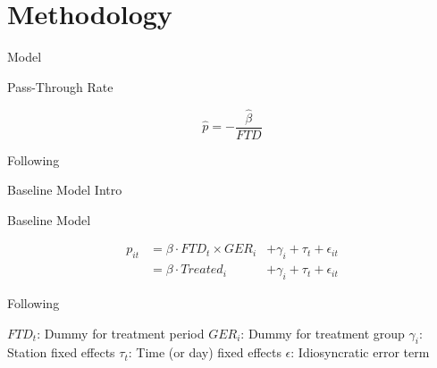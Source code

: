 \section{Methodology}






\begin{frame}{Model}


\vspace{-0.7cm}



\begin{block}{Pass-Through Rate}

\begin{equation}
\label{eq:Pass_Through_Rate}
\hat{p} = - \frac{\hat{\beta}}{FTD} 
\end{equation}

\end{block}



Following \textcite{Frondel2024}

\end{frame}






\begin{frame}{Baseline Model Intro}

\vspace{-0.7cm}

\begin{block}{Baseline Model}

\begin{equation}
\begin{aligned}
\label{eq:Base_DiD1}
p_{it} &= \beta \cdot FTD_{t} \times GER_{i} &+ \gamma_{i} + \tau_{t} + \epsilon_{it} \\
&= \beta \cdot Treated_{i} &+ \gamma_{i} + \tau_{t} + \epsilon_{it}
\end{aligned}
\end{equation}

\begin{tiny}
    Following \textcite{Frondel2024}
\end{tiny}

\end{block}

\begin{outline}
    \1 $FTD_{t}$: Dummy for treatment period
    \1 $GER_{i}$: Dummy for treatment group
    \1 $\gamma_{i}$: Station fixed effects
    \1 $\tau_{t}$: Time (or day) fixed effects
    \1 $\epsilon$: Idiosyncratic error term
\end{outline}






\end{frame}




